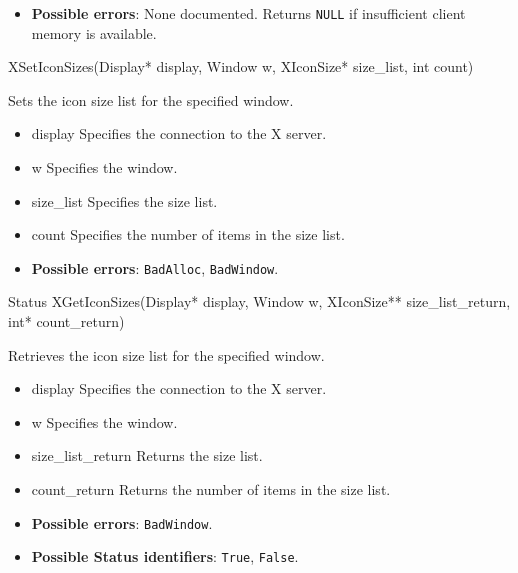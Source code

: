 \documentclass{report}
\begin{document}
\begin{itemize}
            \begin{itemize}
                \item \textbf{Possible errors}: None documented. Returns \texttt{NULL} if insufficient client memory is available.
            \end{itemize}

            \begin{cppcode}
                XSetIconSizes(Display* display, Window w, XIconSize* size_list, int count)
            \end{cppcode}
            \bigbreak \noindent
            Sets the icon size list for the specified window.

            \begin{itemize}
                \item display Specifies the connection to the X server.
                \item w Specifies the window.
                \item size\_list Specifies the size list.
                \item count Specifies the number of items in the size list.
            \end{itemize}

            \begin{itemize}
                \item \textbf{Possible errors}: \texttt{BadAlloc}, \texttt{BadWindow}.
            \end{itemize}

            \begin{cppcode}
                Status XGetIconSizes(Display* display, Window w, XIconSize** size_list_return, int* count_return)
            \end{cppcode}
            \bigbreak \noindent
            Retrieves the icon size list for the specified window.

            \begin{itemize}
                \item display Specifies the connection to the X server.
                \item w Specifies the window.
                \item size\_list\_return Returns the size list.
                \item count\_return Returns the number of items in the size list.
            \end{itemize}

            \begin{itemize}
                \item \textbf{Possible errors}: \texttt{BadWindow}.
                \item \textbf{Possible Status identifiers}: \texttt{True}, \texttt{False}.
            \end{itemize}


\end{itemize}
\end{document}
